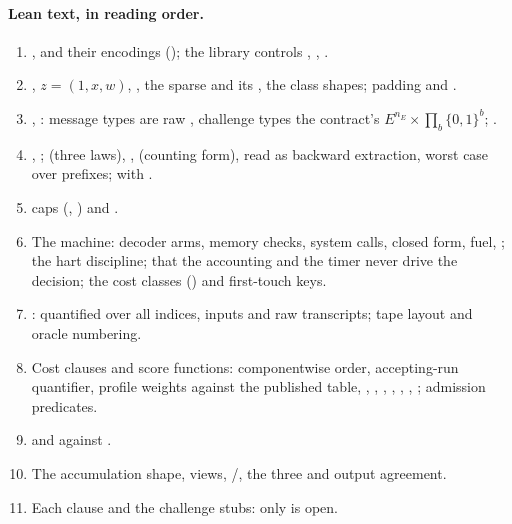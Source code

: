 \paragraph{Lean text, in reading order.}
\begin{enumerate}[nosep,leftmargin=1.6em]
\item {},  and their encodings (); the library controls ,
  , .
\item {}, $z=(1,x,w)$, , the sparse  and its , the class
  shapes; padding and .
\item {}, : message types are raw , challenge types the
  contract's $E^{n_E}\times\prod_b\{0,1\}^b$; .
\item {}, ;  (three laws), ,
   (counting form), read as backward extraction, worst case over prefixes;
   with .
\item {} caps (, ) and .
\item The machine: decoder arms, memory checks, system calls,  closed form, fuel,
  ; the hart discipline; that the accounting and the timer never drive the decision; the
  cost classes () and first-touch keys.
\item {}: quantified over all indices, inputs and raw transcripts; tape layout and oracle
  numbering.
\item Cost clauses and score functions: componentwise order, accepting-run quantifier, profile
  weights against the published table, , , , ,
  , , ; admission predicates.
\item {} and  against .
\item The accumulation shape, views, /, the three 
  and output agreement.
\item Each  clause and the challenge stubs: only  is open.
\end{enumerate}

